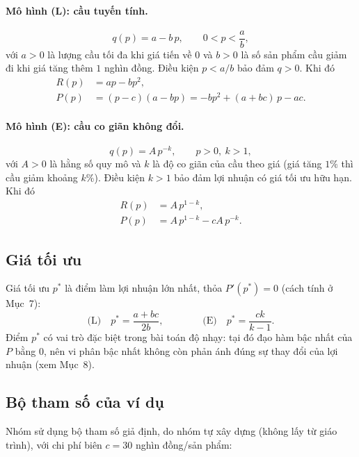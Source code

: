 \paragraph{Mô hình (L): cầu tuyến tính.}
\begin{equation}
q(p) = a - b\,p, \qquad 0 < p < \frac{a}{b},
\end{equation}
với $a>0$ là lượng cầu tối đa khi giá tiến về $0$ và $b>0$ là số sản phẩm cầu giảm đi
khi giá tăng thêm $1$ nghìn đồng. Điều kiện $p<a/b$ bảo đảm $q>0$. Khi đó
\begin{align}
R(p) &= ap - bp^2, \\
P(p) &= (p-c)(a-bp) = -bp^2 + (a+bc)\,p - ac.
\end{align}

\paragraph{Mô hình (E): cầu co giãn không đổi.}
\begin{equation}
q(p) = A\,p^{-k}, \qquad p>0,\ k>1,
\end{equation}
với $A>0$ là hằng số quy mô và $k$ là độ co giãn của cầu theo giá (giá tăng $1\%$ thì
cầu giảm khoảng $k\%$). Điều kiện $k>1$ bảo đảm lợi nhuận có giá tối ưu hữu hạn. Khi đó
\begin{align}
R(p) &= A\,p^{1-k}, \\
P(p) &= A\,p^{1-k} - cA\,p^{-k}.
\end{align}

\subsection{Giá tối ưu}
Giá tối ưu $p^*$ là điểm làm lợi nhuận lớn nhất, thỏa $P'(p^*)=0$ (cách tính ở Mục~7):
\begin{equation}
\text{(L)}\quad p^* = \frac{a+bc}{2b}, \qquad\qquad
\text{(E)}\quad p^* = \frac{ck}{k-1}.
\end{equation}
Điểm $p^*$ có vai trò đặc biệt trong bài toán độ nhạy: tại đó đạo hàm bậc nhất của $P$
bằng $0$, nên vi phân bậc nhất không còn phản ánh đúng sự thay đổi của lợi nhuận
(xem Mục~8).

\subsection{Bộ tham số của ví dụ}
Nhóm sử dụng bộ tham số giả định, do nhóm tự xây dựng (không lấy từ giáo trình), với
chi phí biên $c=30$ nghìn đồng/sản phẩm:

